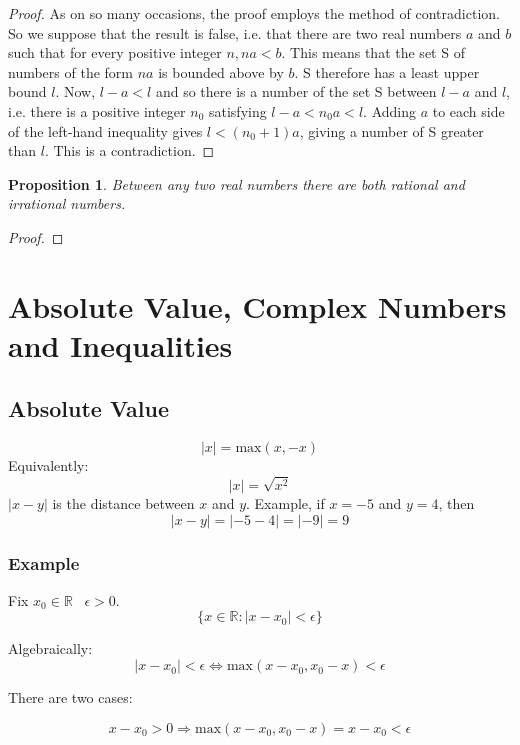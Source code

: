 \documentclass[12pt]{scrbook}
\newtheorem{proposition}{Proposition}[section]
\begin{document}
\begin{proof}
As on so many occasions, the proof employs the method of contradiction.  So we suppose that the result is false, i.e. that there are two real numbers $a$ and $b$ such that for every positive integer $n, na < b$. This means that the set S of numbers of the form $na$ is bounded above by $b$.  S therefore has a least upper bound $l$.  Now, $l - a < l$ and so there is a number of the set S between $l - a$ and $l$, i.e. there is a positive integer $n_0$ satisfying $l - a < n_0 a < l$.  Adding $a$ to each side of the left-hand inequality gives $l < (n_0 + 1)a$, giving a number of S greater than $l$.  This is a contradiction.
\end{proof}

\begin{proposition}
Between any two real numbers there are both rational and irrational numbers.
\end{proposition}

\begin{proof}

\end{proof}


\chapter{Absolute Value, Complex Numbers and Inequalities}

\section{Absolute Value}

\[ |x| = \text{max}(x, -x) \]
Equivalently:
\[ |x| = \sqrt{x^2} \]
$|x - y|$ is the distance between $x$ and $y$. Example, if $x = -5$ and $y = 4$, then 
\[ |x-y| = |-5-4| = |-9| = 9 \]

\subsection{Example}
Fix $x_0 \in \mathbb{R} \;\;\; \epsilon > 0$.
\[ \{ x \in \mathbb{R} : |x - x_0| < \epsilon \} \]

Algebraically:
\[ |x - x_0| < \epsilon \Leftrightarrow \text{max}(x - x_0, x_0 - x) < \epsilon \]

There are two cases:

\[ x - x_0 > 0 \Rightarrow \text{max}(x - x_0, x_0 - x) = x - x_0 < \epsilon \]
\end{document}
